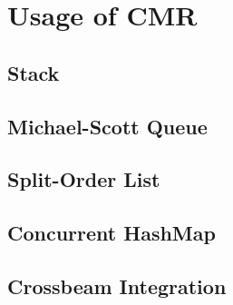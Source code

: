 \chapter{Usage of CMR}
\blindtext{}

\section{Stack}
\blindtext{}

\section{Michael-Scott Queue}
\blindtext{}

\section{Split-Order List}
\blindtext{}

\section{Concurrent HashMap}
\blindtext{}

\section{Crossbeam Integration}
\blindtext{}
